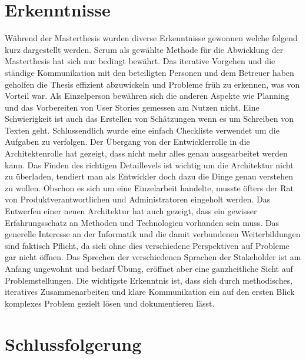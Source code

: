 \chapter{Erkenntnisse}

Während der Masterthesis wurden diverse Erkenntnisse gewonnen welche folgend kurz dargestellt werden.\newline \newline \noindent 
Scrum als gewählte Methode für die Abwicklung der Masterthesis hat sich nur bedingt bewährt. Das iterative Vorgehen und die ständige Kommunikation mit den beteiligten Personen und dem Betreuer haben geholfen die Thesis effizient abzuwickeln und Probleme früh zu erkennen, was von Vorteil war. Als Einzelperson bewähren sich die anderen Aspekte wie Planning und das Vorbereiten von User Stories gemessen am Nutzen nicht. Eine Schwierigkeit ist auch das Erstellen von Schätzungen wenn es um Schreiben von Texten geht. Schlussendlich wurde eine einfach Checkliste verwendet um die Aufgaben zu verfolgen.\newline \newline \noindent 
Der Übergang von der Entwicklerrolle in die Architektenrolle hat gezeigt, dass nicht mehr alles genau ausgearbeitet werden kann. Das Finden des richtigen Detaillevels ist wichtig um die Architektur nicht zu überladen, tendiert man als Entwickler doch dazu die Dinge genau verstehen zu wollen. Obschon es sich um eine Einzelarbeit handelte, musste öfters der Rat von Produktverantwortlichen und Administratoren eingeholt werden. Das Entwerfen einer neuen Architektur hat auch gezeigt, dass ein gewisser Erfahrungsschatz an Methoden und Technologien vorhanden sein muss. Das generelle Interesse an der Informatik und die damit verbundenen Weiterbildungen sind faktisch Pflicht, da sich ohne dies verschiedene Perspektiven auf Probleme gar nicht öffnen. Das Sprechen der verschiedenen Sprachen der Stakeholder ist am Anfang ungewohnt und bedarf Übung, eröffnet aber eine ganzheitliche Sicht auf Problemstellungen.\newline \newline \noindent 
Die wichtigste Erkenntnis ist, dass sich durch methodisches, iteratives Zusammenarbeiten und klare Kommunikation ein auf den ersten Blick komplexes Problem gezielt lösen und dokumentieren lässt.

\chapter{Schlussfolgerung}

